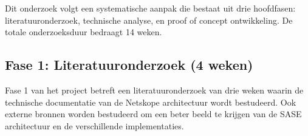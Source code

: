 
\chapter{}%
\label{ch:methodologie}


Dit onderzoek volgt een systematische aanpak die bestaat uit drie hoofdfasen: literatuuronderzoek, technische analyse, en proof of concept ontwikkeling. De totale onderzoeksduur bedraagt 14 weken.

\section{Fase 1: Literatuuronderzoek (4 weken)}
Fase 1 van het project betreft een literatuuronderzoek van drie weken waarin de technische documentatie van de Netskope architectuur wordt bestudeerd. Ook externe bronnen worden bestudeerd om een beter beeld te krijgen van de SASE architectuur en de verschillende implementaties.

